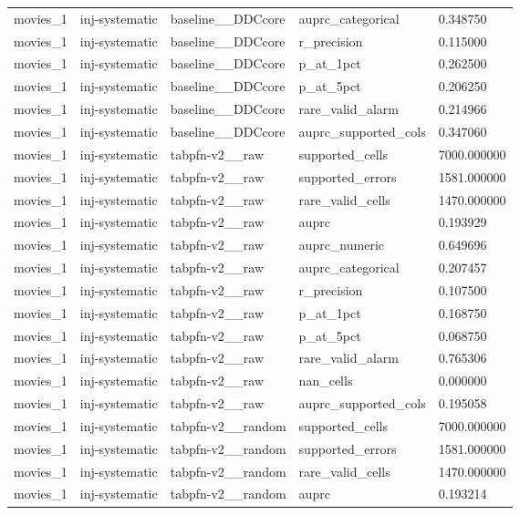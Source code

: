 \begin{tabular}{lllll}
movies\_1 & inj-systematic & baseline\_\_DDCcore & auprc\_categorical & 0.348750 \\
movies\_1 & inj-systematic & baseline\_\_DDCcore & r\_precision & 0.115000 \\
movies\_1 & inj-systematic & baseline\_\_DDCcore & p\_at\_1pct & 0.262500 \\
movies\_1 & inj-systematic & baseline\_\_DDCcore & p\_at\_5pct & 0.206250 \\
movies\_1 & inj-systematic & baseline\_\_DDCcore & rare\_valid\_alarm & 0.214966 \\
movies\_1 & inj-systematic & baseline\_\_DDCcore & auprc\_supported\_cols & 0.347060 \\
movies\_1 & inj-systematic & tabpfn-v2\_\_raw & supported\_cells & 7000.000000 \\
movies\_1 & inj-systematic & tabpfn-v2\_\_raw & supported\_errors & 1581.000000 \\
movies\_1 & inj-systematic & tabpfn-v2\_\_raw & rare\_valid\_cells & 1470.000000 \\
movies\_1 & inj-systematic & tabpfn-v2\_\_raw & auprc & 0.193929 \\
movies\_1 & inj-systematic & tabpfn-v2\_\_raw & auprc\_numeric & 0.649696 \\
movies\_1 & inj-systematic & tabpfn-v2\_\_raw & auprc\_categorical & 0.207457 \\
movies\_1 & inj-systematic & tabpfn-v2\_\_raw & r\_precision & 0.107500 \\
movies\_1 & inj-systematic & tabpfn-v2\_\_raw & p\_at\_1pct & 0.168750 \\
movies\_1 & inj-systematic & tabpfn-v2\_\_raw & p\_at\_5pct & 0.068750 \\
movies\_1 & inj-systematic & tabpfn-v2\_\_raw & rare\_valid\_alarm & 0.765306 \\
movies\_1 & inj-systematic & tabpfn-v2\_\_raw & nan\_cells & 0.000000 \\
movies\_1 & inj-systematic & tabpfn-v2\_\_raw & auprc\_supported\_cols & 0.195058 \\
movies\_1 & inj-systematic & tabpfn-v2\_\_random & supported\_cells & 7000.000000 \\
movies\_1 & inj-systematic & tabpfn-v2\_\_random & supported\_errors & 1581.000000 \\
movies\_1 & inj-systematic & tabpfn-v2\_\_random & rare\_valid\_cells & 1470.000000 \\
movies\_1 & inj-systematic & tabpfn-v2\_\_random & auprc & 0.193214 \\

\end{tabular}
